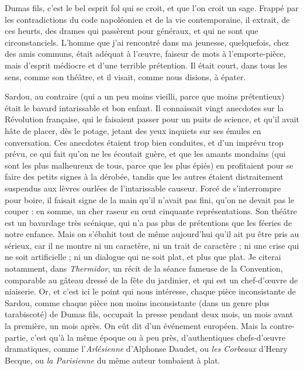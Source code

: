 \documentclass[french,twoside]{book} %
\begin{document}
Dumas fils, c’est le bel esprit fol qui se croit, et que l’on croit un sage. Frappé par les contradictions du code napoléonien et de la vie contemporaine, il extrait, de ces heurts, des drames qui passèrent pour généraux, et qui ne sont que circonstanciels. L’homme que j’ai rencontré dans ma jeunesse, quelquefois, chez des amis communs, était adéquat à l’œuvre, faiseur de mots à l’emporte-pièce, mais d’esprit médiocre et d’une terrible prétention. Il était court, dans tous les sens, comme son théâtre, et il visait, comme nous disions, à épater.\par
Sardou, au contraire (qui a un peu moins vieilli, parce que moins prétentieux) était le bavard intarissable et bon enfant. Il connaissait vingt anecdotes sur la Révolution française, qui le faisaient passer pour un puits de science, et qu’il avait hâte de placer, dès le potage, jetant des yeux inquiets sur ses émules en conversation. Ces anecdotes étaient trop bien conduites, et d’un imprévu trop prévu, ce qui fait qu’on ne les écoutait guère, et que les amants mondains (qui sont les plus malheureux de tous, parce que les plus épiés) en profitaient pour se faire des petits signes à la dérobée, tandis que les autres étaient distraitement suspendus aux lèvres ourlées de l’intarissable causeur. Forcé de s’interrompre pour boire, il faisait signe de la main qu’il n’avait pas fini, qu’on ne devait pas le couper : en somme, un cher raseur en cent cinquante représentations. Son théâtre est un bavardage très scénique, qui n’a pas plus de prétentions que les féeries de notre enfance. Mais on s’ébahit tout de même aujourd’hui qu’il ait pu être pris au sérieux, car il ne montre ni un caractère, ni un trait de caractère ; ni une crise qui ne soit artificielle ; ni un dialogue qui ne soit plat, et plus que plat. Je citerai notamment, dans {\itshape Thermidor}, un récit de la séance fameuse de la Convention, comparable au gâteau dressé de la fête du jardinier, et qui est un chef-d’œuvre de niaiserie. Or, et c’est ici le point qui nous intéresse, chaque pièce inconsistante de Sardou, comme chaque pièce non moins inconsistante (dans un genre plus tarabiscoté) de Dumas fils, occupait la presse pendant deux mois, un mois avant la première, un mois après. On eût dit d’un événement européen. Mais la contre-partie, c’est qu’à la même époque ou à peu près, d’authentiques chefs-d’œuvre dramatiques, comme l’{\itshape Arlésienne} d’Alphonse Daudet, ou {\itshape les Corbeaux} d’Henry Becque, ou {\itshape la Parisienne} du même auteur tombaient à plat.\par
\end{document}
